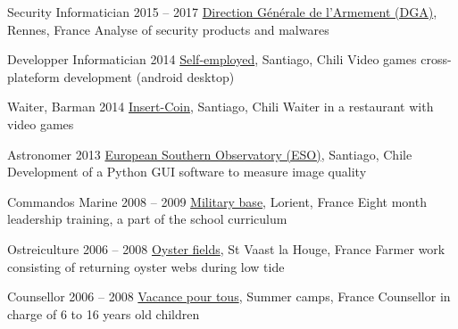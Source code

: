 \begin{joblist}[13.2][7.8][3.5]


\item[Security Informatician]{2015 -- 2017}
	{
	\href{http://www.defense.gouv.fr/dga/}{Direction Générale de l'Armement (DGA)}, Rennes, France
	}
	{Analyse of security products and malwares}


\item[Developper Informatician]{2014}
	{
	\href{https://play.google.com/store/apps/developer?id=tinmarino&hl=en}{Self-employed}, Santiago, Chili
	}
	{Video games cross-plateform development (android desktop)}


\item[Waiter, Barman]{2014}
	{
	\href{http://www.insertcoin.cl/}{Insert-Coin}, Santiago, Chili
	}
	{Waiter in a restaurant with video games}


\item[Astronomer]{2013}
	{
	\href{http://www.eso.org/public/}{European Southern Observatory (ESO)}, Santiago, Chile
	}
	{Development of a Python GUI software to measure image quality}

	
\item[Commandos Marine]{2008 -- 2009}
	{
	\href{http://www.defense.gouv.fr/marine/organisation/forces/fusiliers-marins-et-commandos/force-maritime-des-fusiliers-marins-et-commandos}{Military base}, Lorient, France
	}
	{Eight ­month leadership training, a part of the school curriculum}


\item[Ostreiculture]{2006 -- 2008}
	{
	\href{http://huitresdesaintvaast.fr/}{Oyster fields}, St Vaast la Houge, France
	}
	{Farmer work consisting of returning oyster webs during low tide}


\item[Counsellor]{2006 -- 2008}
	{
	\href{http://www.vacances-pour-tous.org/}{Vacance pour tous}, Summer camps, France
	}
	{Counsellor in charge of 6 to 16 years old children}
	
	
\end{joblist}


